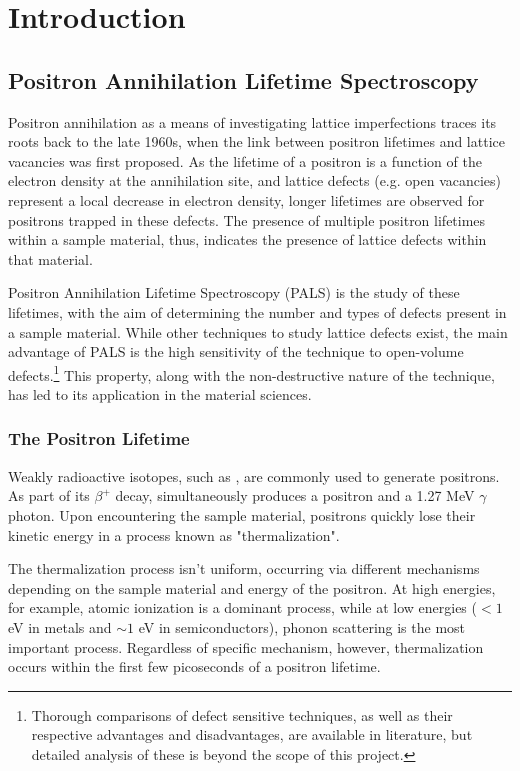 \chapter{Introduction}

\section{Positron Annihilation Lifetime Spectroscopy}

Positron annihilation as a means of investigating lattice imperfections traces its roots back to the late 1960s, when the link between positron lifetimes and lattice vacancies was first proposed. \cite{Mackenzie67} As the lifetime of a positron is a function of the electron density at the annihilation site, and lattice defects (e.g. open vacancies) represent a local decrease in electron density, longer lifetimes are observed for positrons trapped in these defects. \cite{Krause} The presence of multiple positron lifetimes within a sample material, thus, indicates the presence of lattice defects within that material.

Positron Annihilation Lifetime Spectroscopy (PALS) is the study of these lifetimes, with the aim of determining the number and types of defects present in a sample material. While other techniques to study lattice defects exist, the main advantage of PALS is the high sensitivity of the technique to open-volume defects.\footnote{Thorough comparisons of defect sensitive techniques, as well as their respective advantages and disadvantages, are available in literature, but detailed analysis of these is beyond the scope of this project.} This property, along with the non-destructive nature of the technique, has led to its application in the material sciences.\cite{Nuc} 

\subsection{The Positron Lifetime}

Weakly radioactive isotopes, such as , are commonly used to generate positrons. As part of its {$\beta^{+}$} decay,  simultaneously produces a positron and a 1.27 MeV $\gamma$ photon. Upon encountering the sample material, positrons quickly lose their kinetic energy in a process known as "thermalization".

The thermalization process isn't uniform, occurring via different mechanisms depending on the sample material and energy of the positron. At high energies, for example, atomic ionization is a dominant process, while at low energies ($<1$ eV in metals and $\sim1$ eV in semiconductors), phonon scattering is the most important process. Regardless of specific mechanism, however, thermalization occurs within the first few picoseconds of a positron lifetime.

